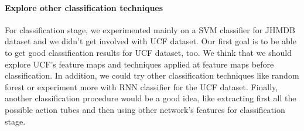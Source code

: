 \paragraph{Explore other  classification techniques}
For classification stage, we experimented mainly on a SVM classifier for JHMDB dataset and we didn't get involved with UCF dataset. Our first
goal is to be able to get good classification results for UCF dataset, too.  We think that we should explore UCF's feature maps and techniques applied at feature maps before  classification. In addition, we could try other classification techniques like random forest or experiment more with RNN classifier for the UCF dataset.
Finally, another classification procedure would be a good idea, like extracting first all the possible action tubes and then using other network's features for classification
stage.

% 
